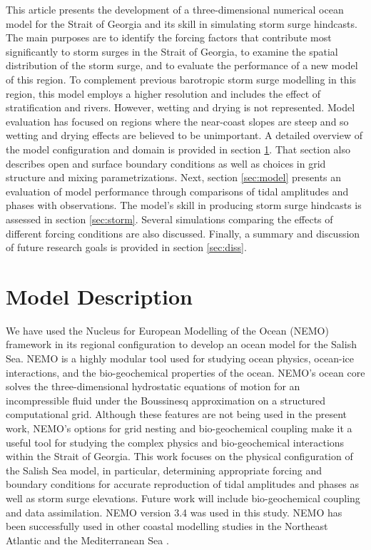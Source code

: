 \documentclass[letterpaper]{tATO2e}
\begin{document}
This article presents the development of a three-dimensional numerical ocean model for the Strait of Georgia and its skill in simulating storm surge hindcasts. {\color{red} The main purposes are to identify the forcing factors that contribute most significantly to storm surges in the Strait of Georgia, to examine the spatial distribution of the storm surge, and to evaluate the performance of a new model of this region.}  To complement previous barotropic storm surge modelling in this region, this model employs a higher resolution and includes the effect of stratification and rivers. However, wetting and drying is not represented. Model evaluation has focused on regions where the near-coast slopes are steep and so wetting and drying effects are believed to be unimportant. A detailed overview of the model configuration and domain is provided in section \ref{sec:config}. That section also describes open and surface boundary conditions as well as choices in grid structure and mixing parametrizations. Next, section \ref{sec:model} presents an evaluation of model performance through comparisons of tidal amplitudes and phases with observations. The model's skill in producing storm surge hindcasts is assessed in section \ref{sec:storm}. Several simulations comparing the effects of different forcing conditions are also discussed. Finally, a summary and discussion of future research goals is provided in section \ref{sec:diss}.  

\section{Model Description}\label{sec:config}

We have used the Nucleus for European Modelling of the Ocean (NEMO) framework in its regional configuration \citep{madec2012nemo} to develop an ocean model for the Salish Sea. NEMO is a highly modular tool used for studying ocean physics, ocean-ice interactions, and the bio-geochemical properties of the ocean. NEMO's ocean core solves the three-dimensional hydrostatic equations of motion for an incompressible fluid under the Boussinesq approximation on a structured computational grid. {\color{red} Although these features are not being used in the present work, NEMO's options for grid nesting and bio-geochemical coupling make it a useful tool for studying the complex physics and bio-geochemical interactions within the Strait of Georgia.} This work focuses on the physical configuration of the Salish Sea model, in particular, determining appropriate forcing and boundary conditions for accurate reproduction of tidal amplitudes and phases as well as storm surge elevations. Future work will include bio-geochemical coupling and data assimilation. NEMO version 3.4 was used in this study. {\color{red} NEMO has been successfully used in other coastal modelling studies in the Northeast Atlantic \citep{maraldi2013nemo} and the Mediterranean Sea \citep{brossier2012sensitivity}.} 
\end{document}
